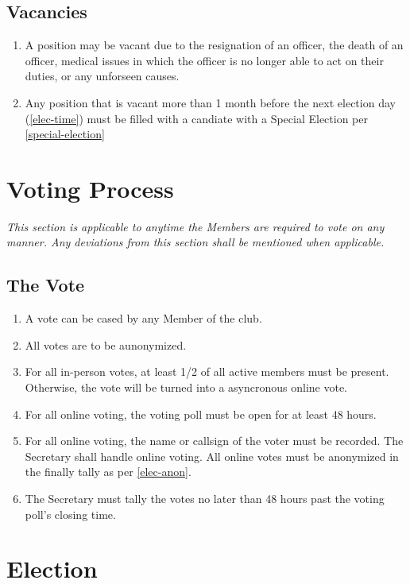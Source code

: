 \documentclass[a4paper,12pt]{article}
\begin{document}
\subsection{Vacancies}
\begin{enumerate}
  \item A position may be vacant due to the resignation of an officer, the death of an officer, medical issues in which the officer is no longer able to act on their duties, or any unforseen causes.
  \item Any position that is vacant more than 1 month before the next election day (\cref{elec-time}) must be filled with a candiate with a Special Election per \cref{special-election}
\end{enumerate}

\section{Voting Process} \label{Voting}
\textit{This section is applicable to anytime the Members are required to vote on any manner. Any deviations from this section shall be mentioned when applicable.}
\subsection{The Vote}
\begin{enumerate}
  \item A vote can be cased by any Member of the club.
  \item \label{elec-anon} All votes are to be aunonymized.
  \item For all in-person votes, at least 1/2 of all active members must be present. Otherwise, the vote will be turned into a asyncronous online vote.
  \item For all online voting, the voting poll must be open for at least 48 hours.
  \item For all online voting, the name or callsign of the voter must be recorded. The Secretary shall handle online voting. All online votes must be anonymized in the finally tally as per \cref{elec-anon}.
  \item The Secretary must tally the votes no later than 48 hours past the voting poll's closing time.
\end{enumerate}

\section{Election}
\end{document}
